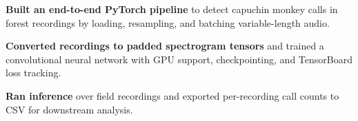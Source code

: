 \begin{bullets}
    \item \textbf{Built an end-to-end PyTorch pipeline} to detect capuchin monkey calls in forest recordings by loading, resampling, and batching variable-length audio.
    \item \textbf{Converted recordings to padded spectrogram tensors} and trained a convolutional neural network with GPU support, checkpointing, and TensorBoard loss tracking.
    \item \textbf{Ran inference} over field recordings and exported per-recording call counts to CSV for downstream analysis.
\end{bullets}